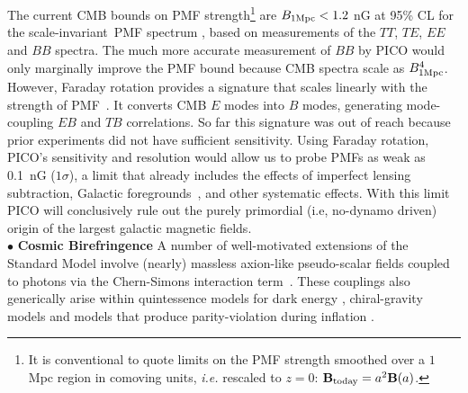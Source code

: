 \documentclass[PICOReport.tex]{subfiles}
\begin{document}
The current CMB bounds on PMF strength\footnote{It is conventional to quote limits on the PMF strength smoothed over a $1$ Mpc region in comoving units, {\it i.e.} rescaled to $z=0$: $\mathbf{B}_{\rm today} = a^2\mathbf{B}(a)$.} are $B_{\rm 1Mpc}<1.2$ nG at 95\% CL for the scale-invariant~PMF spectrum \cite{Zucca:2016iur}, based on measurements of the $TT$, $TE$, $EE$ and $BB$ spectra. 
The much more accurate measurement of $BB$ by PICO would only marginally improve the PMF bound because CMB spectra scale as $B^4_{1\rm{Mpc}}$. However, Faraday rotation provides a signature that scales linearly with the strength of PMF~\cite{Kosowsky:1996yc}. It converts CMB $E$ modes into $B$ modes, generating mode-coupling $EB$ and $TB$ correlations. So far this signature was out of reach because prior experiments did not have sufficient sensitivity. Using Faraday rotation, PICO's sensitivity and resolution would allow us to probe PMFs as weak as 0.1~nG ($1\sigma$), a limit that already includes the effects of imperfect lensing subtraction, Galactic foregrounds~\cite{Oppermann:2011td,De:2013dra,Pogosian:2013dya}, and other systematic effects. With this limit PICO will conclusively rule out the purely primordial (i.e, no-dynamo driven) origin of the largest galactic magnetic fields. \\
%
$\bullet$ {\bf Cosmic Birefringence} \hspace{0.1in}
A number of well-motivated extensions of the Standard Model involve (nearly) massless axion-like pseudo-scalar fields coupled to photons via the Chern-Simons interaction term~\cite{Freese:1990rb,Frieman:1995pm,Carroll:1998zi,Kaloper:2005aj}. These couplings also generically arise within quintessence models for dark energy \cite{Carroll:1998zi}, chiral-gravity models \cite{2008PhRvL.101n1101C} and models that produce parity-violation during inflation \cite{Gluscevic:2010vv}.
\end{document}
